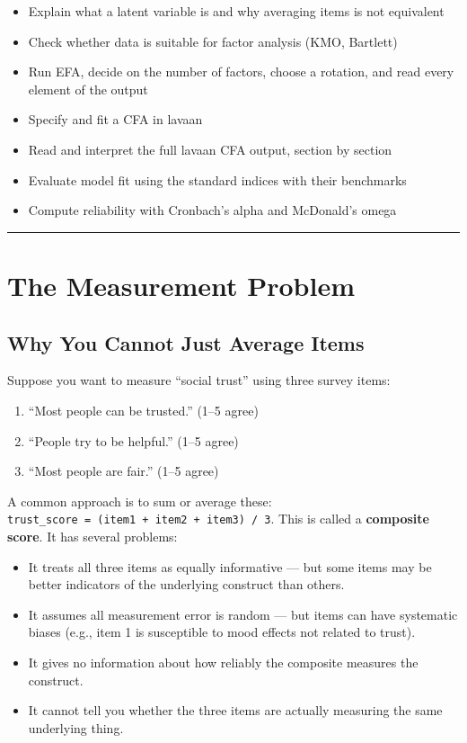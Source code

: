 \documentclass[
]{article}
\providecommand{\tightlist}{%
  \setlength{\itemsep}{0pt}\setlength{\parskip}{0pt}}
\begin{document}
\begin{itemize}
\tightlist
\item
  Explain what a latent variable is and why averaging items is not
  equivalent
\item
  Check whether data is suitable for factor analysis (KMO, Bartlett)
\item
  Run EFA, decide on the number of factors, choose a rotation, and read
  every element of the output
\item
  Specify and fit a CFA in lavaan
\item
  Read and interpret the full lavaan CFA output, section by section
\item
  Evaluate model fit using the standard indices with their benchmarks
\item
  Compute reliability with Cronbach's alpha and McDonald's omega
\end{itemize}

\begin{center}\rule{0.5\linewidth}{0.5pt}\end{center}

\section{The Measurement Problem}\label{the-measurement-problem}

\subsection{Why You Cannot Just Average
Items}\label{why-you-cannot-just-average-items}

Suppose you want to measure ``social trust'' using three survey items:

\begin{enumerate}
\def\labelenumi{\arabic{enumi}.}
\tightlist
\item
  ``Most people can be trusted.'' (1--5 agree)
\item
  ``People try to be helpful.'' (1--5 agree)
\item
  ``Most people are fair.'' (1--5 agree)
\end{enumerate}

A common approach is to sum or average these:
\texttt{trust\_score\ =\ (item1\ +\ item2\ +\ item3)\ /\ 3}. This is
called a \textbf{composite score}. It has several problems:

\begin{itemize}
\tightlist
\item
  It treats all three items as equally informative --- but some items
  may be better indicators of the underlying construct than others.
\item
  It assumes all measurement error is random --- but items can have
  systematic biases (e.g., item 1 is susceptible to mood effects not
  related to trust).
\item
  It gives no information about how reliably the composite measures the
  construct.
\item
  It cannot tell you whether the three items are actually measuring the
  same underlying thing.
\end{itemize}
\end{document}
